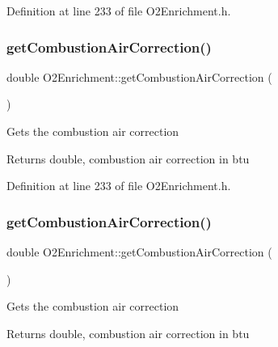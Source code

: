 Definition at line 233 of file O2\+Enrichment.\+h.

\mbox{\label{class_o2_enrichment_a7ecca6a53529843246555ae33379d464}} 
\subsubsection{\texorpdfstring{get\+Combustion\+Air\+Correction()}{getCombustionAirCorrection()}\hspace{0.1cm}{\footnotesize\ttfamily [2/3]}}
{\footnotesize\ttfamily double O2\+Enrichment\+::get\+Combustion\+Air\+Correction (\begin{DoxyParamCaption}{ }\end{DoxyParamCaption})\hspace{0.3cm}{\ttfamily [inline]}}

Gets the combustion air correction \begin{DoxyReturn}{Returns}
double, combustion air correction in btu 
\end{DoxyReturn}


Definition at line 233 of file O2\+Enrichment.\+h.

\mbox{\label{class_o2_enrichment_a7ecca6a53529843246555ae33379d464}} 
\subsubsection{\texorpdfstring{get\+Combustion\+Air\+Correction()}{getCombustionAirCorrection()}\hspace{0.1cm}{\footnotesize\ttfamily [3/3]}}
{\footnotesize\ttfamily double O2\+Enrichment\+::get\+Combustion\+Air\+Correction (\begin{DoxyParamCaption}{ }\end{DoxyParamCaption})\hspace{0.3cm}{\ttfamily [inline]}}

Gets the combustion air correction \begin{DoxyReturn}{Returns}
double, combustion air correction in btu 
\end{DoxyReturn}


